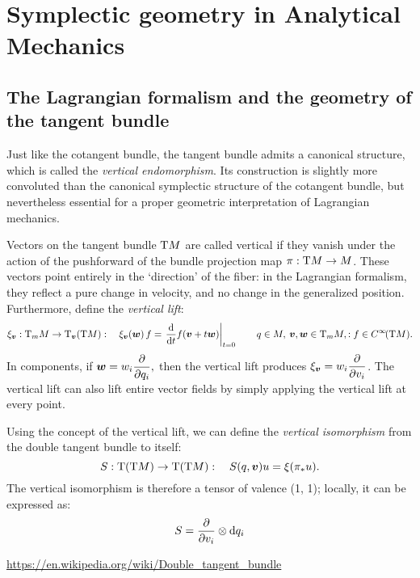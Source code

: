 \chapter{Symplectic geometry in Analytical Mechanics}
\label{app:symplectic_geometry}

\section{The Lagrangian formalism and the geometry of the tangent bundle}
Just like the cotangent bundle, the tangent bundle admits a canonical structure, which is called the \emph{vertical endomorphism}. Its construction is slightly more convoluted than the canonical symplectic structure of the cotangent bundle, but nevertheless essential for a proper geometric interpretation of Lagrangian mechanics. 

Vectors on the tangent bundle $\mathrm{T}M$ are called vertical if they vanish under the action of the pushforward of the bundle projection map $\pi: \mathrm{T}M \to M$. These vectors point entirely in the `direction' of the fiber: in the Lagrangian formalism, they reflect a pure change in velocity, and no change in the generalized position. Furthermore, define the \emph{vertical lift}: \cite{Carinena1990} 
$$ \xi_{\vec{v}}: \tspace{m}{M} \to \tspace{\vec{v}}{\qty(\tbundle{M})}:\quad \xi_{\vec{v}}(\vec{w})\,f = \left. \dv{}{t} f(\vec{v} + t\vec{w})\right |_{t = 0}\qquad q \in M,\: \vec{v},\vec{w}\in \tspace{m}{M},: f \in \functions{\tbundle{M}}. $$
In components, if $ \displaystyle \vec{w} = w_i \pdv{}{q_i}, $ then the vertical lift produces $ \displaystyle \xi_{\vec{v}} = w_i \pdv{}{v_i} $. The vertical lift can also lift entire vector fields by simply applying the vertical lift at every point.

Using the concept of the vertical lift, we can define the \emph{vertical isomorphism} from the double tangent bundle to itself:
$$ S: \tbundle{\qty(\tbundle{M})} \to \tbundle{\qty(\tbundle{M})}: \quad S(q, \vec{v}) u = \xi(\pi_* u).  $$
The vertical isomorphism is therefore a tensor of valence (1, 1); locally, it can be expressed as:
$$ S = \pdv{}{v_i}\otimes \dd{q_i} $$


\url{https://en.wikipedia.org/wiki/Double_tangent_bundle}


